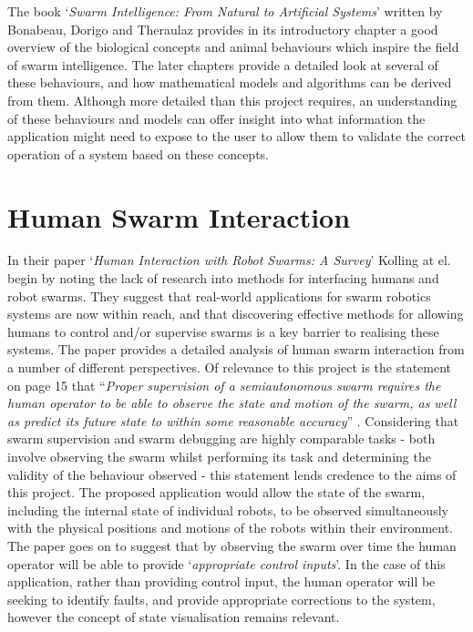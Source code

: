 The book `\textit{Swarm Intelligence: From Natural to Artificial Systems}' written by Bonabeau, Dorigo and Theraulaz \cite{Bonabeau:1999} provides in its introductory chapter a good overview of the biological concepts and animal behaviours which inspire the field of swarm intelligence. The later chapters provide a detailed look at several of these behaviours, and how mathematical models and algorithms can be derived from them. Although more detailed than this project requires, an understanding of these behaviours and models can offer insight into what information the application might need to expose to the user to allow them to validate the correct operation of a system based on these concepts.


\section{Human Swarm Interaction} \label{HumanSwarmInteraction}
In their paper `\textit{Human Interaction with Robot Swarms: A Survey}' \cite{Kolling:2016} Kolling at el. begin by noting the lack of research into methods for interfacing humans and robot swarms. They suggest that real-world applications for swarm robotics systems are now within reach, and that discovering effective methods for allowing humans to control and/or supervise swarms is a key barrier to realising these systems. The paper \cite{Kolling:2016} provides a detailed analysis of human swarm interaction from a number of different perspectives. Of relevance to this project is the statement on page 15 that ``\textit{Proper supervision of a semiautonomous swarm requires the human operator to be able to observe the state and motion of the swarm, as well as predict its future state to within some reasonable accuracy}'' \cite{Kolling:2016}. Considering that swarm supervision and swarm debugging are highly comparable tasks - both involve observing the swarm whilst performing its task and determining the validity of the behaviour observed  - this statement lends credence to the aims of this project. The proposed application would allow the state of the swarm, including the internal state of individual robots, to be observed simultaneously with the physical positions and motions of the robots within their environment. The paper \cite{Kolling:2016} goes on to suggest that by observing the swarm over time the human operator will be able to provide `\textit{appropriate control inputs}'. In the case of this application, rather than providing control input, the human operator will be seeking to identify faults, and provide appropriate corrections to the system, however the concept of state visualisation remains relevant.

